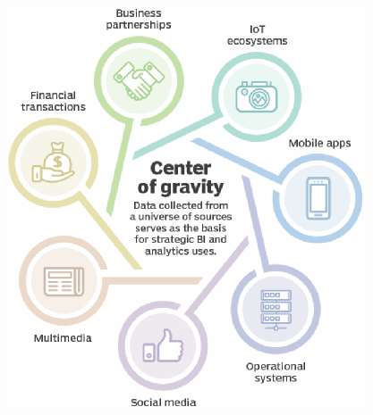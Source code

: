 \documentclass[aspectratio=169,xcolor=x11names,table]{beamer}
\begin{document}
\begin{frame}
\begin{columns}
\begin{column}{0.3\linewidth}
\begin{figure}
				\includegraphics[width=\columnwidth]{data_collect}
			\end{figure}
		\end{column}
	\end{columns}
\end{frame}
\end{document}
